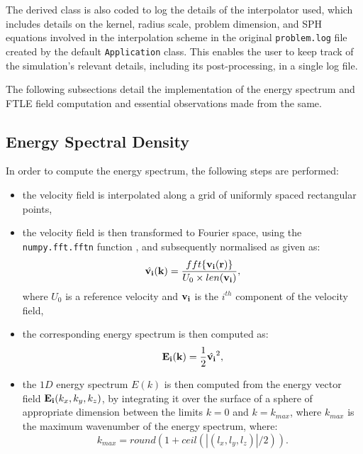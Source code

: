 The derived class is also coded to log the details of the interpolator used, which includes details on the kernel, radius scale, problem dimension, and SPH equations involved in the interpolation scheme in the original \texttt{problem.log} file created by the default \texttt{Application} class. This enables the user to keep track of the simulation's relevant details, including its post-processing, in a single log file.

The following subsections detail the implementation of the energy spectrum and FTLE field computation and essential observations made from the same.


\subsection{Energy Spectral Density}
In order to compute the energy spectrum, the following steps are performed:

\begin{itemize}
    \item the velocity field is interpolated along a grid of uniformly spaced rectangular points,
    \item the velocity field is then transformed to Fourier space, using the \texttt{numpy.fft.fftn} function \parencite{harris2020array}, and subsequently normalised as given as:
    \begin{equation}
        \hat{\mathbf{v_i}}(\mathbf{k}) = \frac{ fft\{ \mathbf{v_i}(\mathbf{r}) \} }{U_0 \times len(\mathbf{v_i})},
    \end{equation}
    where $U_0$ is a reference velocity and $\mathbf{v_i}$ is the $i^{th}$ component of the velocity field,
    \item the corresponding energy spectrum is then computed as:
    \begin{equation}
        \mathbf{E_i}(\mathbf{k}) = \frac{1}{2} \hat{\mathbf{v_i}}^2,
    \end{equation}
    \item the $1D$ energy spectrum $E(k)$ is then computed from the energy vector field $\mathbf{E_i}(k_x, k_y, k_z)$, by integrating it over the surface of a sphere of appropriate dimension between the limits $k=0$ and $k=k_{max}$, where $k_{max}$ is the maximum wavenumber of the energy spectrum, where:
    \begin{equation}
        k_{max} = round(1 + ceil(|(l_x, l_y, l_z)|/2)).
    \end{equation}
\end{itemize}

